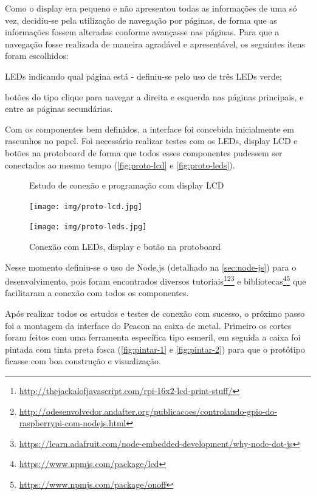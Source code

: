 Como o display era pequeno e não apresentou todas as informações de uma só vez, decidiu-se pela utilização de navegação por páginas, de forma que as informações fossem alteradas conforme avançasse nas páginas. Para que a navegação fosse realizada de maneira agradável e apresentável, os seguintes itens foram escolhidos:

\begin{alineas}
	\item LEDs indicando qual página está - definiu-se pelo uso de três LEDs verde;
	\item botões do tipo clique para navegar a direita e esquerda nas páginas principais, e entre as páginas secundárias.
\end{alineas}

Com os componentes bem definidos, a interface foi concebida inicialmente em rascunhos no papel. Foi necessário realizar testes com os LEDs, display LCD e botões na protoboard de forma que todos esses componentes pudessem ser conectados ao mesmo tempo (\autoref{fig:proto-lcd} e \autoref{fig:proto-leds}). 

\begin{figure}[htb]
	\centering
 	\begin{minipage}{0.47\textwidth}
		\centering
		\caption{\label{fig:proto-lcd}Estudo de conexão e programação com display LCD}
		\texttt{[image: img/proto-lcd.jpg]}
	\end{minipage}
	\hfill
	\begin{minipage}{0.47\textwidth}
		\centering
		\caption{\label{fig:proto-leds}Conexão com LEDs, display e botão na protoboard}
		\texttt{[image: img/proto-leds.jpg]}
	\end{minipage}
\end{figure}

Nesse momento definiu-se o uso de Node.js (detalhado na \autoref{sec:node-js}) para o desenvolvimento, pois foram encontrados diversos tutoriais\footnote{\url{http://thejackalofjavascript.com/rpi-16x2-lcd-print-stuff/}}\footnote{\url{http://odesenvolvedor.andafter.org/publicacoes/controlando-gpio-do-raspberrypi-com-nodejs.html}}\footnote{\url{https://learn.adafruit.com/node-embedded-development/why-node-dot-js}} e bibliotecas\footnote{\url{https://www.npmjs.com/package/lcd}}\footnote{\url{https://www.npmjs.com/package/onoff}} que facilitaram a conexão com todos os componentes.

Após realizar todos os estudos e testes de conexão com sucesso, o próximo passo foi a montagem da interface do Peacon na caixa de metal. Primeiro os cortes foram feitos com uma ferramenta específica tipo esmeril, em seguida a caixa foi pintada com tinta preta fosca (\autoref{fig:pintar-1} e \autoref{fig:pintar-2}) para que o protótipo ficasse com boa construção e visualização.

